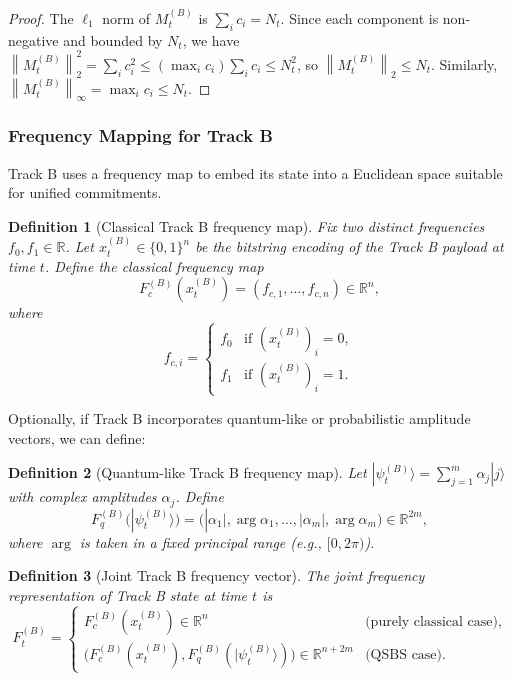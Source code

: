 \documentclass[11pt]{article}
\newtheorem{definition}{Definition}[section]
\newcommand{\R}{\mathbb{R}}
\newcommand{\norm}[1]{\left\lVert #1 \right\rVert}
\begin{document}
\begin{proof}
The \(\ell_1\) norm of \(M_t^{(B)}\) is \(\sum_i c_i = N_t\).
Since each component is non-negative and bounded by \(N_t\), we have
\(
\norm{M_t^{(B)}}_2^2 = \sum_i c_i^2 \le \left(\max_i c_i\right)\sum_i c_i \le N_t^2
\),
so \(\norm{M_t^{(B)}}_2 \le N_t\).
Similarly, \(\norm{M_t^{(B)}}_\infty = \max_i c_i \le N_t\).
\end{proof}

\subsubsection{Frequency Mapping for Track B}

Track B uses a frequency map to embed its state into a Euclidean space suitable for unified commitments.

\begin{definition}[Classical Track B frequency map]
Fix two distinct frequencies \(f_0, f_1 \in \R\).
Let \(x_t^{(B)} \in \{0,1\}^n\) be the bitstring encoding of the Track B payload at time \(t\).
Define the classical frequency map
\[
  F_c^{(B)}(x_t^{(B)}) = (f_{c,1}, \dots, f_{c,n}) \in \R^n,
\]
where
\[
  f_{c,i} =
  \begin{cases}
    f_0 & \text{if } (x_t^{(B)})_i = 0, \\
    f_1 & \text{if } (x_t^{(B)})_i = 1.
  \end{cases}
\]
\end{definition}

Optionally, if Track B incorporates quantum-like or probabilistic amplitude vectors, we can define:

\begin{definition}[Quantum-like Track B frequency map]
Let \(|\psi_t^{(B)}\rangle = \sum_{j=1}^m \alpha_j |j\rangle\) with complex amplitudes \(\alpha_j\).
Define
\[
  F_q^{(B)}(|\psi_t^{(B)}\rangle) = 
  \bigl(|\alpha_1|, \arg \alpha_1, \dots, |\alpha_m|, \arg \alpha_m\bigr) \in \R^{2m},
\]
where \(\arg\) is taken in a fixed principal range (e.g., \([0,2\pi)\)).
\end{definition}

\begin{definition}[Joint Track B frequency vector]
The joint frequency representation of Track B state at time \(t\) is
\[
  F_t^{(B)} =
  \begin{cases}
    F_c^{(B)}(x_t^{(B)}) \in \R^n & \text{(purely classical case)},\\[0.5em]
    \bigl(F_c^{(B)}(x_t^{(B)}), F_q^{(B)}(|\psi_t^{(B)}\rangle)\bigr) \in \R^{n+2m} & \text{(QSBS case)}.
  \end{cases}
\]
\end{definition}
\end{document}
